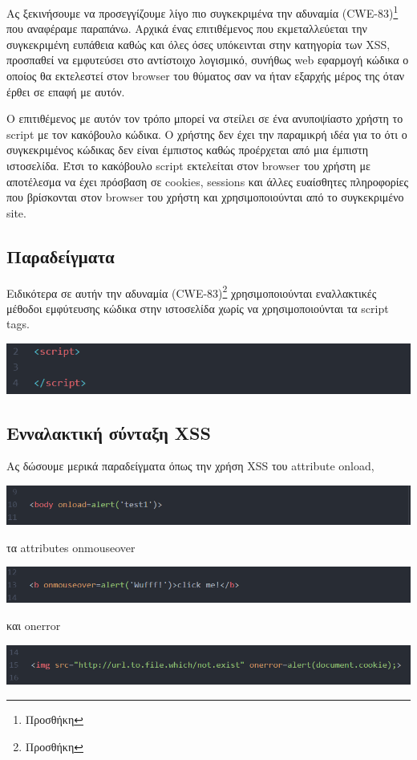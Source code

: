 \noindent
Ας ξεκινήσουμε να προσεγγίζουμε λίγο πιο συγκεκριμένα την αδυναμία (CWE-83)\footnote{Προσθήκη} που αναφέραμε παραπάνω.  Αρχικά ένας επιτιθέμενος που εκμεταλλεύεται την συγκεκριμένη ευπάθεια καθώς και όλες όσες υπόκεινται στην κατηγορία των XSS, προσπαθεί να εμφυτεύσει στο αντίστοιχο λογισμικό, συνήθως web εφαρμογή κώδικα ο οποίος θα εκτελεστεί στον browser του θύματος σαν να ήταν εξαρχής μέρος της όταν έρθει σε επαφή με αυτόν. 

\noindent
Ο επιτιθέμενος με αυτόν τον τρόπο μπορεί να στείλει σε ένα ανυποψίαστο χρήστη το script με τον κακόβουλο κώδικα. Ο χρήστης δεν έχει την παραμικρή ιδέα για το ότι ο συγκεκριμένος κώδικας δεν είναι έμπιστος καθώς προέρχεται από μια έμπιστη ιστοσελίδα. Έτσι το κακόβουλο script εκτελείται στον browser του χρήστη με αποτέλεσμα να έχει πρόσβαση σε cookies, sessions και άλλες ευαίσθητες πληροφορίες που βρίσκονται στον browser του χρήστη και χρησιμοποιούνται από το συγκεκριμένο site.

\subsection{Παραδείγματα}
\noindent
Ειδικότερα σε αυτήν την αδυναμία (CWE-83)\footnote{Προσθήκη} χρησιμοποιούνται εναλλακτικές μέθοδοι εμφύτευσης κώδικα στην ιστοσελίδα χωρίς να χρησιμοποιούνται τα script tags.
\begin{center}
			\includegraphics[width=1\textwidth]{image/1 script tags.PNG}		
\end{center}

\subsection{Ενναλακτική σύνταξη XSS}
\noindent
Ας δώσουμε μερικά παραδείγματα όπως την χρήση XSS του attribute onload,
\begin{center}
			\includegraphics[width=1\textwidth]{image/2.PNG}		
\end{center}

\noindent
τα attributes onmouseover
\begin{center}
			\includegraphics[width=1\textwidth]{image/3.PNG}		
\end{center}
\noindent
και onerror
\begin{center}
			\includegraphics[width=1\textwidth]{image/4.PNG}		
\end{center}
